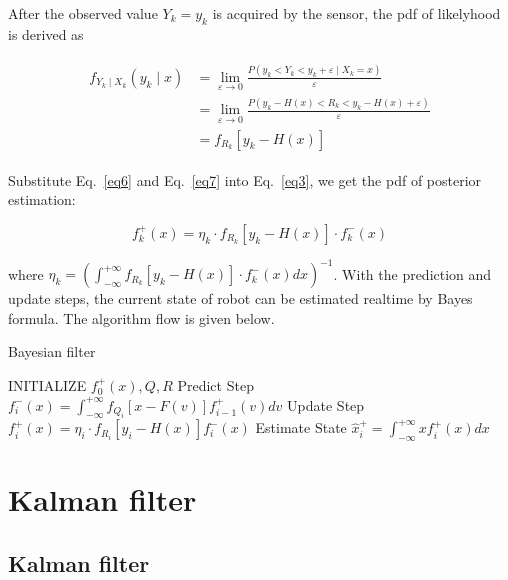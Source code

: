 \documentclass[conference]{IEEEtran}
\begin{document}
	After the observed value $Y_{k}=y_{k}$ is acquired by the sensor, the pdf of likelyhood is derived as
	
	\begin{equation}
	\begin{split}
	\begin{aligned}
	f_{Y_{k}\mid X_{k}}(y_{k}\mid x)&=\lim\limits_{\varepsilon \rightarrow 0}\frac{P(y_{k}<Y_{k}<y_{k}+\varepsilon\mid X_{k}=x)}{\varepsilon}\\
	&=\lim_{\varepsilon \rightarrow 0}\frac{P(y_{k}-H(x)<R_{k}<y_{k}-H(x)+\varepsilon)}{\varepsilon}\\
	&=f_{R_{k}}[y_{k}-H(x)]
	\label{eq7}
	\end{aligned}
	\end{split}
	\end{equation}
	
	Substitute Eq.~\ref{eq6} and Eq.~\ref{eq7} into Eq.~\ref{eq3}, we get the pdf of posterior estimation:
	
	\begin{equation}
		f_{k}^{+}(x)=\eta_{k} \cdot f_{R_{k}}[y_{k}-H(x)]\cdot f_{k}^{-}(x)
		\label{eq8}
	\end{equation}
	
	where $\eta_{k} = (\int_{-\infty}^{+\infty}f_{R_{k}}[y_{k}-H(x)]\cdot f_{k}^{-}(x)dx)^{-1}$. With the prediction and update steps, the current state of robot can be estimated realtime by Bayes formula. The algorithm flow is given below.

	
	\begin{algorithm}
		\caption{Bayesian filter}
		
		\begin{algorithmic}  
			\STATE INITIALIZE $f_{0}^{+}(x), Q, R$
			\STATE Predict Step
			$f_{i}^{-}(x)=\int_{-\infty}^{+\infty}f_{Q_{i}}[x-F(v)]f_{i-1}^{+}(v)dv$
			\STATE Update Step
			$f_{i}^{+}(x)=\eta_{i}\cdot f_{R_{i}}[y_{i}-H(x)]f_{i}^{-}(x)$
			\STATE Estimate State $\hat{x}_{i}^{+}=\int_{-\infty}^{+\infty}xf_{i}^{+}(x)dx$
			\ENDFOR
		\end{algorithmic}
	\end{algorithm}
	
	\section{Kalman filter}
	
	\subsection{Kalman filter}
	
\end{document}
